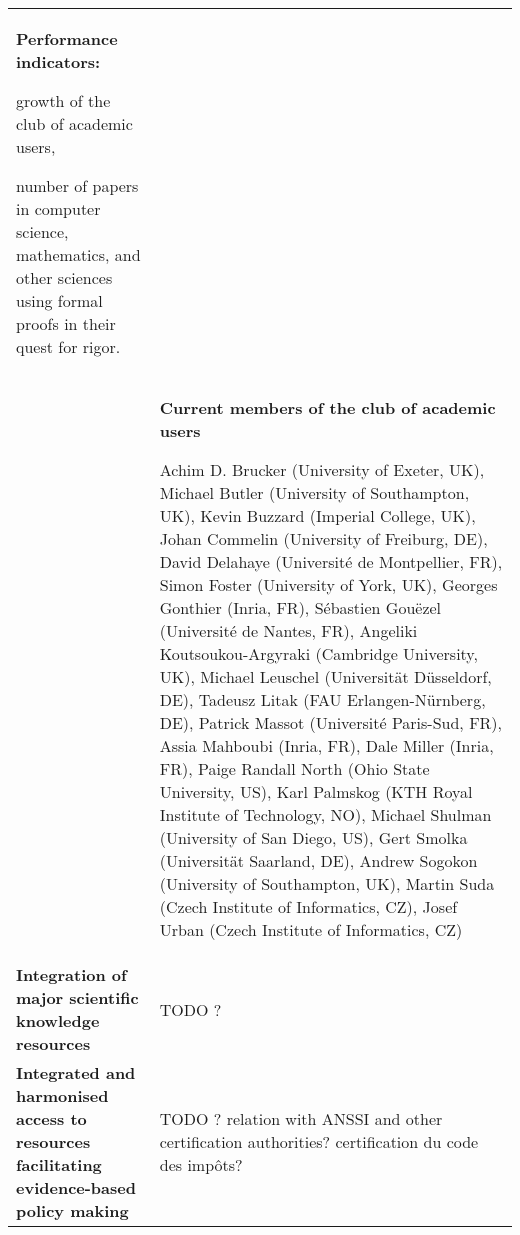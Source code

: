 \begin{longtable}{|p{}|p{}|}
\colorbox{color3}{\bf Performance indicators:}
\begin{compactitem}
\item growth of the club of academic users, 
\item number of papers in computer science, mathematics, and other sciences
using formal proofs in their quest for rigor.
\end{compactitem}
\\
&
\definecolor{shadecolor}{named}{color1}
\begin{shaded}
\begin{center}
  {\bf\large Current members of the club of academic users}
\end{center}
Achim D. Brucker (University of Exeter, UK),
Michael Butler (University of Southampton, UK),
Kevin Buzzard (Imperial College, UK),
Johan Commelin (University of Freiburg, DE),
David Delahaye (Université de Montpellier, FR),
Simon Foster (University of York, UK),
Georges Gonthier (Inria, FR),
Sébastien Gouëzel (Université de Nantes, FR),
Angeliki Koutsoukou-Argyraki (Cambridge University, UK),
Michael Leuschel (Universität Düsseldorf, DE),
Tadeusz Litak (FAU Erlangen-Nürnberg, DE),
Patrick Massot (Université Paris-Sud, FR),
Assia Mahboubi (Inria, FR),
Dale Miller (Inria, FR),
Paige Randall North (Ohio State University, US),
Karl Palmskog (KTH Royal Institute of Technology, NO),
Michael Shulman (University of San Diego, US),
Gert Smolka (Universität Saarland, DE),
Andrew Sogokon (University of Southampton, UK),
Martin Suda (Czech Institute of Informatics, CZ),
Josef Urban (Czech Institute of Informatics, CZ)
\end{shaded}
\\
\hline
{\bf Integration of major scientific knowledge resources}
&
{\color{red}TODO ?}
\\
\hline
{\bf Integrated and harmonised access to resources facilitating evidence-based policy making}
&
{\color{red}TODO ? relation with ANSSI and other certification authorities? certification du code des impôts? }
\\

\end{longtable}
